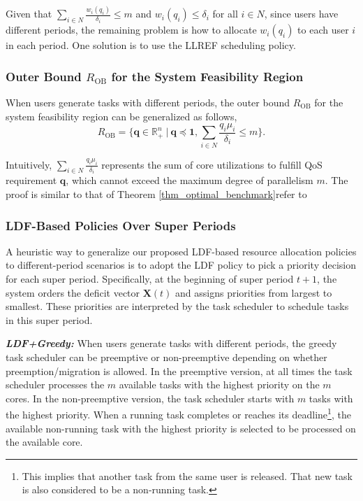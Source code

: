 \documentclass[prodmode,acmtompecs]{acmsmall}
\newcommand{\reqvec}{\mathbf{q}}
\newcommand{\reqscalar}{q}
\newcommand{\fullUserSet}{N}
\newcommand{\myComments}[1]{}
\newif\iftompecsonly
\newif\iftompecsextended
\newcommand{\tompecsonlyStart}{\iftompecsonly \myComments{TOMPECS only version: }}
\newcommand{\tompecsextendedStart}{\iftompecsextended  \myComments{TOMPECS extended version: }}
\newcommand{\commentEnd}{\myComments{End}}
\newcommand{\add}[1]{#1}
\begin{document}
Given that $\sum\limits_{i\in \fullUserSet} \frac{w_i(\reqscalar_i)}{\delta_i} \leq m$ and $w_i(q_i) \leq \delta_i$ for all $i \in \fullUserSet$, since users have different periods, the remaining problem is how to allocate $w_i(\reqscalar_i)$ to each user $i$ in each period. 
One solution is to use the LLREF scheduling policy. 
\tompecsonlyStart
\add{We omit the details to save space. Refer to the extended version of this paper \cite{EXT} for detailed discussion. }
\commentEnd\fi
\tompecsextendedStart
Refer to Appendix \ref{appendix_LLREF_for_RB} for more details. 
\commentEnd\fi

\subsubsection{Outer Bound $R_\text{OB}$ for the System Feasibility Region}

When users generate tasks with different periods, the outer bound $R_\text{OB}$ for the system feasibility region can be generalized as follows, 
$$
R_{\text{OB}} = \{ \reqvec \in \mathbb R^n_+ ~|~ \reqvec \preceq \mathbf{1}, \sum\limits_{i \in \fullUserSet} \frac{\reqscalar_i \mu_i}{\delta_i} \leq m \}. 
$$

Intuitively, $\sum\limits_{i \in \fullUserSet} \frac{\reqscalar_i \mu_i}{\delta_i}$ represents the sum of core utilizations to fulfill QoS requirement $\reqvec$, which cannot exceed the maximum degree of parallelism $m$. The proof is similar to that of Theorem \ref{thm_optimal_benchmark}\textemdash refer to 
\tompecsonlyStart
the extended version of this paper \cite{EXT} for details. 
\commentEnd\fi
\tompecsextendedStart
Appendix \ref{appendix_pf_R_OB_diff_periods} for details. 
\commentEnd\fi

\subsubsection{LDF-Based Policies Over Super Periods}

A heuristic way to generalize our proposed LDF-based resource allocation policies to different-period scenarios is to adopt the LDF policy to pick a priority decision for each super period.  
Specifically, at the beginning of super period $t+1$, the system orders the deficit vector $\mathbf{X}(t)$ and assigns priorities from largest to smallest. 
These priorities are interpreted by the task scheduler to schedule tasks in this super period. 

{\bf \em LDF+Greedy:}
When users generate tasks with different periods, the greedy task scheduler can be preemptive or non-preemptive depending on whether preemption/migration is allowed. In the preemptive version, at all times the task scheduler processes the $m$ available tasks with the highest priority on the $m$ cores. In the non-preemptive version, the task scheduler starts with $m$ tasks with the highest priority. When a running task completes or reaches its deadline\footnote{This implies that another task from the same user is released. That new task is also considered to be a non-running task. }, the available non-running task with the highest priority is selected to be processed on the available core. 
\end{document}
